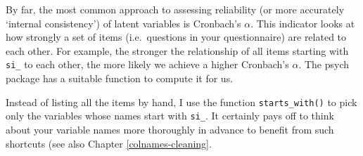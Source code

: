 \documentclass[
]{book}
\begin{document}
By far, the most common approach to assessing reliability (or more accurately `internal consistency') of latent variables is Cronbach's \(\alpha\). This indicator looks at how strongly a set of items (i.e.~questions in your questionnaire) are related to each other. For example, the stronger the relationship of all items starting with \texttt{si\_} to each other, the more likely we achieve a higher Cronbach's \(\alpha\). The psych package has a suitable function to compute it for us.

Instead of listing all the items by hand, I use the function \texttt{starts\_with()} to pick only the variables whose names start with \texttt{si\_}. It certainly pays off to think about your variable names more thoroughly in advance to benefit from such shortcuts (see also Chapter \ref{colnames-cleaning}.
\end{document}
